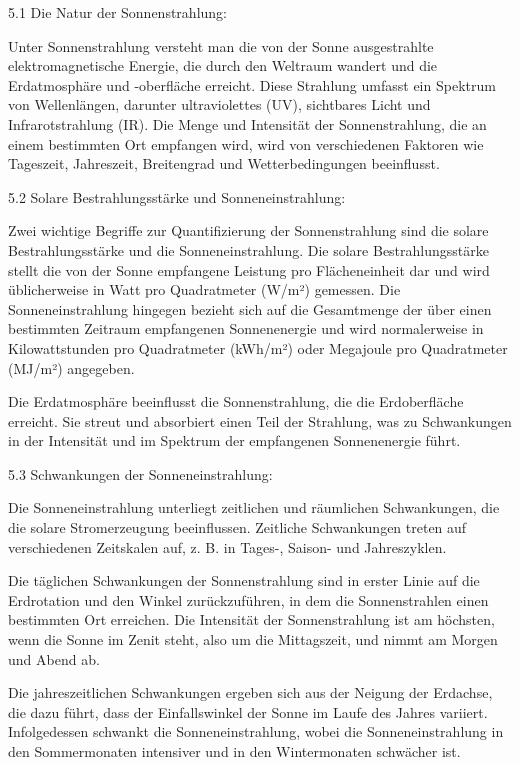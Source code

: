 \documentclass[12pt, a4paper]{article}
\begin{document}
5.1 Die Natur der Sonnenstrahlung:

Unter Sonnenstrahlung versteht man die von der Sonne ausgestrahlte elektromagnetische Energie, die durch den Weltraum wandert und die Erdatmosphäre und -oberfläche erreicht. Diese Strahlung umfasst ein Spektrum von Wellenlängen, darunter ultraviolettes (UV), sichtbares Licht und Infrarotstrahlung (IR). Die Menge und Intensität der Sonnenstrahlung, die an einem bestimmten Ort empfangen wird, wird von verschiedenen Faktoren wie Tageszeit, Jahreszeit, Breitengrad und Wetterbedingungen beeinflusst.

5.2 Solare Bestrahlungsstärke und Sonneneinstrahlung:

Zwei wichtige Begriffe zur Quantifizierung der Sonnenstrahlung sind die solare Bestrahlungsstärke und die Sonneneinstrahlung. Die solare Bestrahlungsstärke stellt die von der Sonne empfangene Leistung pro Flächeneinheit dar und wird üblicherweise in Watt pro Quadratmeter (W/m²) gemessen. Die Sonneneinstrahlung hingegen bezieht sich auf die Gesamtmenge der über einen bestimmten Zeitraum empfangenen Sonnenenergie und wird normalerweise in Kilowattstunden pro Quadratmeter (kWh/m²) oder Megajoule pro Quadratmeter (MJ/m²) angegeben.

Die Erdatmosphäre beeinflusst die Sonnenstrahlung, die die Erdoberfläche erreicht. Sie streut und absorbiert einen Teil der Strahlung, was zu Schwankungen in der Intensität und im Spektrum der empfangenen Sonnenenergie führt.

5.3 Schwankungen der Sonneneinstrahlung:

Die Sonneneinstrahlung unterliegt zeitlichen und räumlichen Schwankungen, die die solare Stromerzeugung beeinflussen. Zeitliche Schwankungen treten auf verschiedenen Zeitskalen auf, z. B. in Tages-, Saison- und Jahreszyklen.

Die täglichen Schwankungen der Sonnenstrahlung sind in erster Linie auf die Erdrotation und den Winkel zurückzuführen, in dem die Sonnenstrahlen einen bestimmten Ort erreichen. Die Intensität der Sonnenstrahlung ist am höchsten, wenn die Sonne im Zenit steht, also um die Mittagszeit, und nimmt am Morgen und Abend ab.

Die jahreszeitlichen Schwankungen ergeben sich aus der Neigung der Erdachse, die dazu führt, dass der Einfallswinkel der Sonne im Laufe des Jahres variiert. Infolgedessen schwankt die Sonneneinstrahlung, wobei die Sonneneinstrahlung in den Sommermonaten intensiver und in den Wintermonaten schwächer ist.
\end{document}
